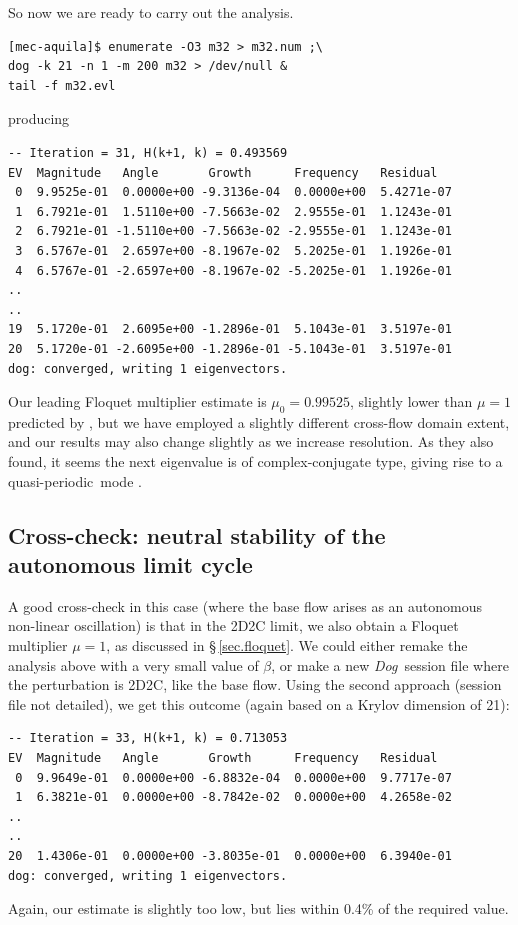 \documentclass[11pt,a4paper]{report}
\newcommand\qp{qua\-si-per\-io\-dic}
\newcommand{\Dog}{\emph{Dog}}
\begin{document}
So now we are ready to carry out the analysis.
\begin{verbatim}
[mec-aquila]$ enumerate -O3 m32 > m32.num ;\
dog -k 21 -n 1 -m 200 m32 > /dev/null &
tail -f m32.evl
\end{verbatim}
\noindent producing
{\small
\begin{verbatim}
-- Iteration = 31, H(k+1, k) = 0.493569
EV  Magnitude   Angle       Growth      Frequency   Residual
 0  9.9525e-01  0.0000e+00 -9.3136e-04  0.0000e+00  5.4271e-07
 1  6.7921e-01  1.5110e+00 -7.5663e-02  2.9555e-01  1.1243e-01
 2  6.7921e-01 -1.5110e+00 -7.5663e-02 -2.9555e-01  1.1243e-01
 3  6.5767e-01  2.6597e+00 -8.1967e-02  5.2025e-01  1.1926e-01
 4  6.5767e-01 -2.6597e+00 -8.1967e-02 -5.2025e-01  1.1926e-01
..
..
19  5.1720e-01  2.6095e+00 -1.2896e-01  5.1043e-01  3.5197e-01
20  5.1720e-01 -2.6095e+00 -1.2896e-01 -5.1043e-01  3.5197e-01
dog: converged, writing 1 eigenvectors.
\end{verbatim}
}
\noindent
Our leading Floquet multiplier estimate is $\mu_0=0.99525$, slightly
lower than $\mu=1$ predicted by \cite{bah96}, but we have employed a
slightly different cross-flow domain extent, and our results may also
change slightly as we increase resolution. As they also found, it
seems the next eigenvalue is of complex-conjugate type, giving rise to
a \qp\ mode \citep{bllo03b}.

\subsection{Cross-check: neutral stability of the autonomous limit cycle}

A good cross-check in this case (where the base flow arises as an
autonomous non-linear oscillation) is that in the 2D2C limit, we also
obtain a Floquet multiplier $\mu=1$, as discussed in
\S\,\ref{sec.floquet}.  We could either remake the analysis above with
a very small value of $\beta$, or make a new \Dog\ session file where
the perturbation is 2D2C, like the base flow.  Using the second
approach (session file not detailed), we get this outcome (again based
on a Krylov dimension of 21): {\small
\begin{verbatim}
-- Iteration = 33, H(k+1, k) = 0.713053
EV  Magnitude   Angle       Growth      Frequency   Residual
 0  9.9649e-01  0.0000e+00 -6.8832e-04  0.0000e+00  9.7717e-07
 1  6.3821e-01  0.0000e+00 -8.7842e-02  0.0000e+00  4.2658e-02
..
..
20  1.4306e-01  0.0000e+00 -3.8035e-01  0.0000e+00  6.3940e-01
dog: converged, writing 1 eigenvectors.
\end{verbatim}
}\noindent Again, our estimate is slightly too low, but lies within
0.4\% of the required value.
\end{document}
